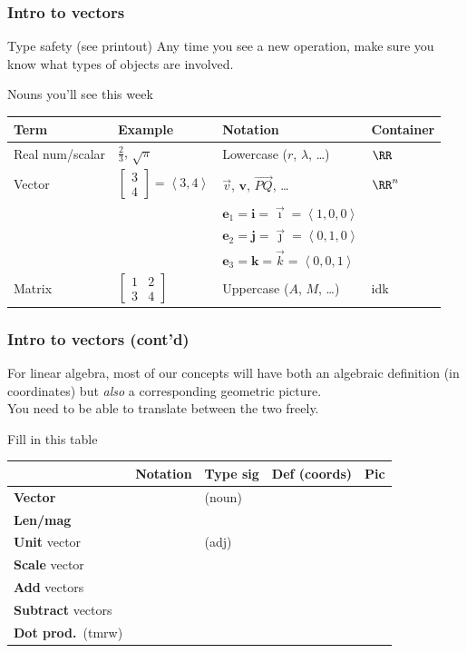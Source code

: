 \documentclass[11pt]{beamer}
\begin{document}
\begin{frame}
  \frametitle{Intro to vectors}
  \begin{alertblock}{Type safety (see printout)}
  Any time you see a new operation,
  make sure you know what \alert{types} of objects are involved.
  \end{alertblock}
  \begin{exampleblock}{Nouns you'll see this week}
    \begin{tabular}{llll}
      Term & Example & Notation & Container \\\hline
      Real num/scalar & $\frac23$, $\sqrt\pi$ & Lowercase ($r$, $\lambda$, \dots) & $\RR$ \\
      Vector & $\begin{bmatrix} 3 \\ 4 \end{bmatrix} = \left< 3,4 \right>$
             & $\vec v$, $\mathbf{v}$, $\overrightarrow{PQ}$, \dots & $\RR^n$ \\
             && $\mathbf{e}_1 = \mathbf{i} = \vec{\imath} = \left< 1,0,0 \right>$ \\
             && $\mathbf{e}_2 = \mathbf{j} = \vec{\jmath} = \left< 0,1,0 \right>$ \\
             && $\mathbf{e}_3 = \mathbf{k} = \vec{k} = \left< 0,0,1 \right>$ \\
      Matrix & $\begin{bmatrix} 1 & 2 \\ 3 & 4 \end{bmatrix}$ & Uppercase ($A$, $M$, \dots)
             & idk
    \end{tabular}
  \end{exampleblock}
\end{frame}

\begin{frame}
  \frametitle{Intro to vectors (cont'd)}
  For linear algebra, most of our concepts will have both an
  \alert{algebraic definition} (in coordinates)
  but \emph{also} a corresponding \alert{geometric picture}. \\
  You need to be able to translate between the two freely.

  \begin{block}{Fill in this table}
  \begin{tabular}{lllll}
    & Notation & Type sig & Def (coords) & Pic \\ \hline
    \textbf{Vector} & & (noun) \\
    \textbf{Len/mag} & \\
    \textbf{Unit} vector & & (adj) \\
    \textbf{Scale} vector & \\
    \textbf{Add} vectors & \\
    \textbf{Subtract} vectors & \\
    \textbf{Dot prod.}\ (tmrw) & \\
  \end{tabular}
  \end{block}
\end{frame}
\end{document}

